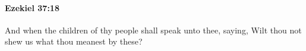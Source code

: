 
		\paragraph{Ezekiel 37:18} %
			\label{EZEKIEL-37-18}

			And when the children of thy people shall speak unto thee, saying, Wilt thou not shew us what thou meanest by these?


